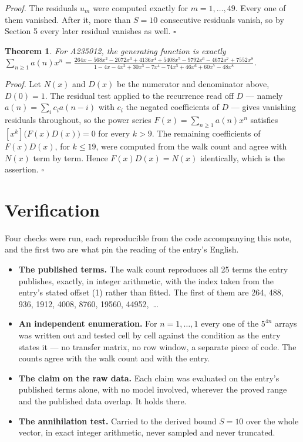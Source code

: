 \documentclass[11pt]{article}
\newtheorem{theorem}{Theorem}
\theoremstyle{definition}
\begin{document}
{\itshape Proof.} The residuals $u_m$ were computed exactly for $m = 1,\dots,49$. Every one of them vanished. After it, more than $S = 10$ consecutive residuals vanish, so by Section 5 every later residual vanishes as well. $\square$

\begin{theorem} For A235012, the generating function is exactly $\sum_{n\ge 1} a(n)x^n = \frac{264x - 568x^{2} - 2072x^{3} + 4136x^{4} + 5408x^{5} - 9792x^{6} - 4672x^{7} + 7552x^{8}}{1 - 4x - 4x^{2} + 30x^{3} - 7x^{4} - 74x^{5} + 46x^{6} + 60x^{7} - 48x^{8}}$.\end{theorem}

{\itshape Proof.} Let $N(x)$ and $D(x)$ be the numerator and denominator above, $D(0)=1$. The residual test applied to the recurrence read off $D$ --- namely $a(n) = \sum_i c_i a(n-i)$ with $c_i$ the negated coefficients of $D$ --- gives vanishing residuals throughout, so the power series $F(x)=\sum_{n\ge 1}a(n)x^n$ satisfies $[x^k]\bigl(F(x)D(x)\bigr) = 0$ for every $k > 9$. The remaining coefficients of $F(x)D(x)$, for $k \le 19$, were computed from the walk count and agree with $N(x)$ term by term. Hence $F(x)D(x) = N(x)$ identically, which is the assertion. $\square$

\section{Verification}

Four checks were run, each reproducible from the code accompanying this note, and the first two are what pin the reading of the entry's English.

\begin{itemize}

\item {\bfseries The published terms.} The walk count reproduces all 25 terms the entry publishes, exactly, in integer arithmetic, with the index taken from the entry's stated offset (1) rather than fitted. The first of them are 264, 488, 936, 1912, 4008, 8760, 19560, 44952,~\dots

\item {\bfseries An independent enumeration.} For $n = 1,\dots,1$ every one of the $5^{4n}$ arrays was written out and tested cell by cell against the condition as the entry states it --- no transfer matrix, no row window, a separate piece of code. The counts agree with the walk count and with the entry.

\item {\bfseries The claim on the raw data.} Each claim was evaluated on the entry's published terms alone, with no model involved, wherever the proved range and the published data overlap. It holds there.

\item {\bfseries The annihilation test.} Carried to the derived bound $S = 10$ over the whole vector, in exact integer arithmetic, never sampled and never truncated.

\end{itemize}
\end{document}

